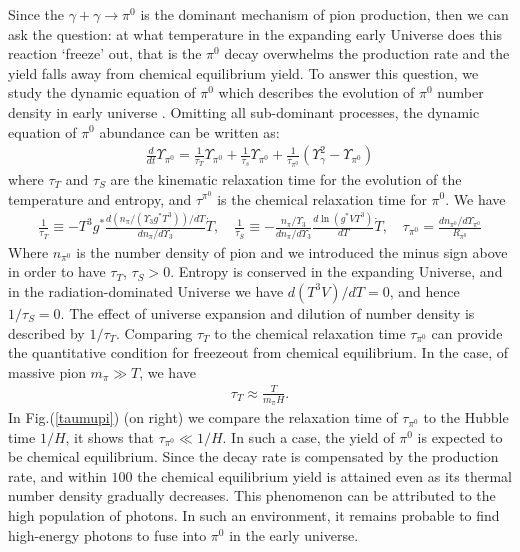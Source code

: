 \documentclass[universe,article,submit,moreauthors,pdftex,a4paper]{Definitions/mdpi}
\begin{document}
Since the  $\gamma+\gamma\to \pi^0$ is the dominant mechanism of pion production, then we can ask the question: at what temperature in the expanding early Universe does this reaction
`freeze' out, that is the $\pi^0$ decay overwhelms the production rate and the yield
falls away from chemical equilibrium yield. To answer this question, we study the dynamic equation of $\pi^0$ which describes the evolution of $\pi^0$ number density in early universe \cite{Fromerth:2012fe}. Omitting all sub-dominant processes, the dynamic equation of $\pi^0$ abundance can be written as:
\begin{align}
\frac{d}{dt}\Upsilon_{\pi^0}=\frac{1}{\tau_T}\Upsilon_{\pi^0}+\frac{1}{\tau_s}\Upsilon_{\pi^0}+\frac{1}{\tau_{\pi^0}}\left(\Upsilon^2_\gamma-\Upsilon_{\pi^0}\right)
\end{align}
where $\tau_T$ and $\tau_S$ are the kinematic relaxation time for the evolution of the temperature and entropy, and $\tau^{\pi^0}$ is the chemical relaxation time for $\pi^0$. We have
\begin{align}
\frac{1}{\tau_T}\equiv -T^3g^*\frac{d (n_{\pi}/(\Upsilon_3
g^*T^3))/dT}{dn_{\pi}/d{\Upsilon_3}}{\dot T},\label{tauT} \quad
\frac{1}{\tau_{S}}\equiv
-\frac{n_{\pi}/\Upsilon_3}{dn_{\pi}/d{\Upsilon_3}}\frac{d\ln (g^*VT^3)}{dT}
\dot{T},\quad
\tau_{\pi^0}=\frac{dn_{\pi^0}/d\Upsilon_{\pi^0}}{R_{\pi^0}} 
\end{align}
Where $n_{\pi^0}$ is the number density of pion and we introduced the minus sign above in order to have $\tau_T$, $\tau_S>0$. Entropy is conserved in the expanding Universe, and in the radiation-dominated Universe we have $d(T^3V)/dT=0$, and hence $1/\tau_S=0$. The effect of universe expansion and dilution of number density is described by $1/\tau_T$. Comparing $\tau_T$ to the chemical relaxation time $\tau_{\pi^0}$ can provide the quantitative condition for freezeout from chemical equilibrium. In the case, of massive pion $m_{\pi}\gg T$, we have \cite{Kuznetsova:2009xh}
\begin{align}
\tau_T\approx\frac{T}{m_{\pi}H}.
\end{align}
 In Fig.(\ref{taumupi}) (on right)  we compare the relaxation time of $\tau_{\pi^0}$ to the Hubble time $1/H$, it shows that $\tau_{\pi^0}\ll 1/H$. In such a case, the yield of $\pi^0$ is expected to be chemical equilibrium. Since the decay rate is compensated by the production rate, and within $100$ the chemical equilibrium yield is attained even as its thermal number density gradually decreases. This phenomenon can be attributed to the high population of photons. In such an environment, it remains probable to find high-energy photons to fuse into $\pi^0$ in the early universe. 
\end{document}
